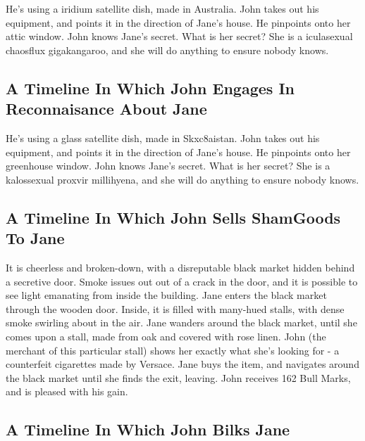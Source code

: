 \documentclass{article}
\begin{document}
He's using a iridium satellite dish, made in Australia.
John takes out his equipment, and points it in the direction of Jane's house. He pinpoints onto her attic window.
John knows Jane's secret. What is her secret? She is a iculasexual chaosflux gigakangaroo, and she will do anything to ensure nobody knows.
\subsection{A Timeline In Which John Engages In Reconnaisance About Jane}


He's using a glass satellite dish, made in Skxc8aistan.
John takes out his equipment, and points it in the direction of Jane's house. He pinpoints onto her greenhouse window.
John knows Jane's secret. What is her secret? She is a kalossexual proxvir millihyena, and she will do anything to ensure nobody knows.
\subsection{A Timeline In Which John Sells ShamGoods To Jane}


It is cheerless and broken{-}down, with a disreputable black market hidden behind a secretive door.
Smoke issues out out of a crack in the door, and it is possible to see light emanating from inside the building.
Jane enters the black market through the wooden door.
Inside, it is filled with many{-}hued stalls, with dense smoke swirling about in the air.
Jane wanders around the black market, until she comes upon a stall, made from oak and covered with rose linen.
John (the merchant of this particular stall) shows her exactly what she's looking for {-} a counterfeit cigarettes made by Versace.
Jane buys the item, and navigates around the black market until she finds the exit, leaving.
John receives 162 Bull Marks, and is pleased with his gain.
\subsection{A Timeline In Which John Bilks Jane}
\end{document}
